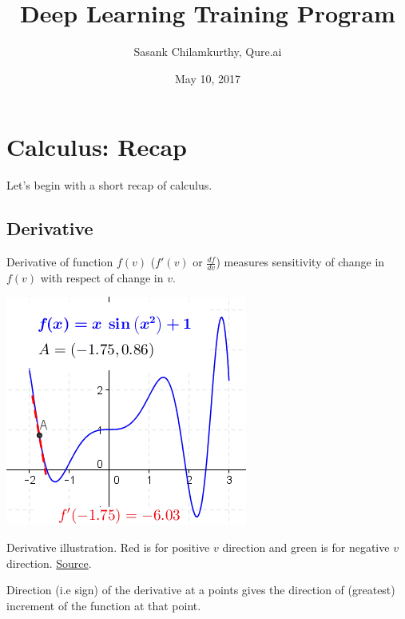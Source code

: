 \documentclass[a4paper]{tufte-handout}
\title{Deep Learning Training Program}
\author{Sasank Chilamkurthy, Qure.ai}
\date{May 10, 2017}
\begin{document}
\maketitle
\tableofcontents

\section{Calculus: Recap}\label{calculus-recap}

Let's begin with a short recap of calculus.

\subsection{Derivative}\label{derivative}

Derivative of function \(f(v)\) (\(f'(v)\) or \(\frac{df}{dv}\))
measures sensitivity of change in \(f(v)\) with respect of change in
\(v\).

\begin{marginfigure}
  \includegraphics[width=\linewidth]{differential.png}
  \caption{Derivative illustration. Red is for positive \(v\)
direction and green is for negative \(v\) direction.
\href{https://en.wikipedia.org/wiki/Derivative}{Source}.}
\end{marginfigure}

Direction (i.e sign) of the derivative at a points gives the direction
of (greatest) increment of the function at that point.
\end{document}
